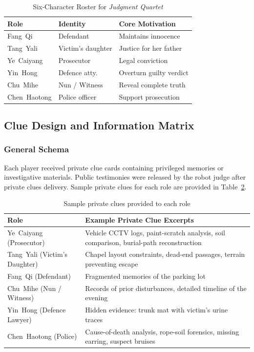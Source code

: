 \documentclass[sigconf,screen]{acmart-tagged}
\begin{document}
\begin{table}[h]
\setlength{\tabcolsep}{13pt}
\caption{Six‐Character Roster for \textit{Judgment Quartet}}
\centering\footnotesize
\label{tab:roster}
\begin{tabularx}{\linewidth}{l l X}   %
\toprule
\textbf{Role} & \textbf{Identity} & \textbf{Core Motivation}\\
\midrule
Fang~Qi      & Defendant          & Maintains innocence\\
Tang~Yali    & Victim's daughter  & Justice for her father\\
Ye~Caiyang   & Prosecutor         & Legal conviction\\
Yin~Hong     & Defence atty.      & Overturn guilty verdict\\
Chu~Mihe     & Nun / Witness      & Reveal complete truth\\
Chen~Haotong & Police officer     & Support prosecution\\
\bottomrule
\end{tabularx}
\end{table}



\subsection{Clue Design and Information Matrix}
\label{clues}

\subsubsection{General Schema} 
Each player received private clue cards containing privileged memories or investigative materials. Public testimonies were released by the robot judge after private clues delivery. Sample private clues for each role are provided in Table~\ref{tab:clues map}.

\begin{table}[H]
\caption{Sample private clues provided to each role}
\label{tab:clues map}
\centering\footnotesize
\begin{tabularx}{\linewidth}{l X}
\toprule
\textbf{Role} & \textbf{Example Private Clue Excerpts}\\
\midrule
Ye~Caiyang (Prosecutor) & Vehicle CCTV logs, paint-scratch analysis, soil comparison, burial-path reconstruction\\
Tang~Yali (Victim's Daughter) & Chapel layout constraints, dead-end passages, terrain preventing escape\\
Fang~Qi (Defendant) & Fragmented memories of the parking lot\\
Chu~Mihe (Nun / Witness) & Records of prior disturbances, detailed timeline of the evening\\
Yin~Hong (Defence Lawyer) & Hidden evidence: trunk mat with victim's urine traces\\
Chen~Haotong (Police) & Cause-of-death analysis, rope-soil forensics, missing earring, suspect bruises\\
\bottomrule
\end{tabularx}
\end{table}
\end{document}
